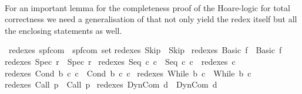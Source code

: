 \begin{isabellebody}
\ \ \isamarkupfalse%
%
\endisatagproof
{\isafoldproof}%
%
\isadelimproof
%
\endisadelimproof
%
\isamarkuptrue%
%
\begin{isamarkuptext}%
For an important lemma for the completeness proof of the Hoare-logic for
total correctness we need a generalisation of  that not only
yield the redex itself but all the enclosing statements as well.%
\end{isamarkuptext}\isamarkuptrue%
\isamarkupfalse%
\ redexes{\isacharcolon}{\isacharcolon}\ {\isachardoublequoteopen}{\isacharparenleft}{\isacharprime}s{\isacharcomma}{\isacharprime}p{\isacharcomma}{\isacharprime}f{\isacharparenright}com\ {\isasymRightarrow}\ {\isacharparenleft}{\isacharprime}s{\isacharcomma}{\isacharprime}p{\isacharcomma}{\isacharprime}f{\isacharparenright}com\ set{\isachardoublequoteclose}\isanewline
{}\isanewline
{\isachardoublequoteopen}redexes\ Skip\ {\isacharequal}\ {\isacharbraceleft}Skip{\isacharbraceright}{\isachardoublequoteclose}\ {\isacharbar}\isanewline
{\isachardoublequoteopen}redexes\ {\isacharparenleft}Basic\ f{\isacharparenright}\ {\isacharequal}\ {\isacharbraceleft}Basic\ f{\isacharbraceright}{\isachardoublequoteclose}\ {\isacharbar}\isanewline
{\isachardoublequoteopen}redexes\ {\isacharparenleft}Spec\ r{\isacharparenright}\ {\isacharequal}\ {\isacharbraceleft}Spec\ r{\isacharbraceright}{\isachardoublequoteclose}\ {\isacharbar}\isanewline
{\isachardoublequoteopen}redexes\ {\isacharparenleft}Seq\ c\ c\ {\isacharequal}\ {\isacharbraceleft}Seq\ c\ c\ {\isasymunion}\ redexes\ c\ {\isacharbar}\isanewline
{\isachardoublequoteopen}redexes\ {\isacharparenleft}Cond\ b\ c\ c\ {\isacharequal}\ {\isacharbraceleft}Cond\ b\ c\ c\ {\isacharbar}\isanewline
{\isachardoublequoteopen}redexes\ {\isacharparenleft}While\ b\ c{\isacharparenright}\ {\isacharequal}\ {\isacharbraceleft}While\ b\ c{\isacharbraceright}{\isachardoublequoteclose}\ {\isacharbar}\isanewline
{\isachardoublequoteopen}redexes\ {\isacharparenleft}Call\ p{\isacharparenright}\ {\isacharequal}\ {\isacharbraceleft}Call\ p{\isacharbraceright}{\isachardoublequoteclose}\ {\isacharbar}\isanewline
{\isachardoublequoteopen}redexes\ {\isacharparenleft}DynCom\ d{\isacharparenright}\ {\isacharequal}\ {\isacharbraceleft}DynCom\ d{\isacharbraceright}{\isachardoublequoteclose}\ {\isacharbar}\isanewline

\end{isabellebody}
